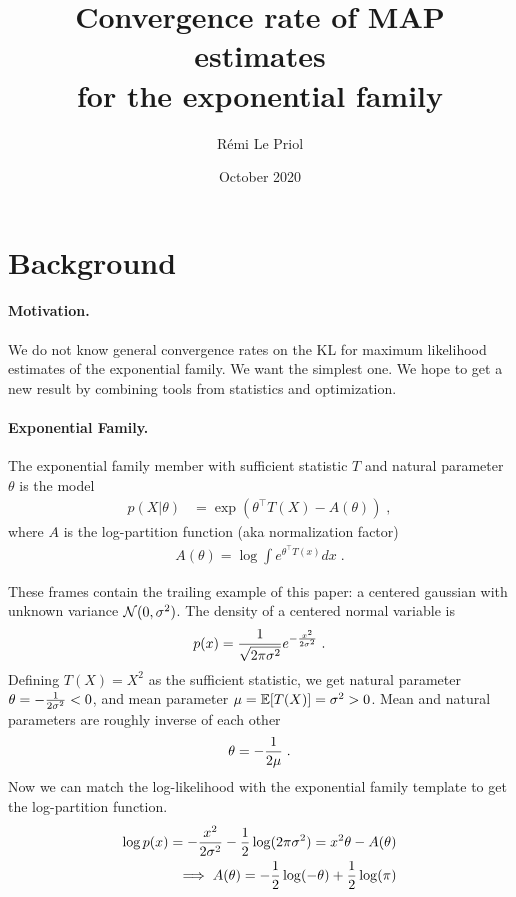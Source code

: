\documentclass{article}
\title{Convergence rate of MAP estimates \\
for the exponential family}
\author{R\'emi Le Priol}
\date{October 2020}
\newenvironment{example}{
	\begin{mdframed}[backgroundcolor=light-gray, roundcorner=5pt]
}{		
	\end{mdframed}
}
\newcommand{\logpart}{A}
\newcommand{\natp}{\theta}
\begin{document}
\maketitle

\section{Background}

\paragraph{Motivation.} 
We do not know general convergence rates on the KL for maximum likelihood estimates of the exponential family.
We want the simplest one.
We hope  to get a new result by combining tools from statistics and optimization. 
\paragraph{Exponential Family.}
The exponential family member with sufficient statistic $T$ and natural parameter $\natp$ is the model 
\begin{align}
    p(X|\natp) &= \exp( \natp^\top T(X) - \logpart(\natp)) \; ,
\end{align}
where $\logpart$ is the log-partition function (aka normalization factor) 
\begin{align}
    \logpart(\natp) = \log \int e^{\natp^\top T(x)} dx \; .
\end{align}

\begin{example}
	These frames contain the trailing example of this paper: a centered gaussian with unknown variance ${\mathcal N}(0,\sigma^2)$.
	The density of a centered normal variable is
\begin{align}
	p(x) = \frac{1}{\sqrt{2\pi \sigma^2}} e^{-\frac{x^2}{2 \sigma^2}} \; .
\end{align}
Defining $T(X)=X^2$ as the sufficient statistic, we get natural parameter $\natp = -\inv{2 \sigma^2} <0$, and mean parameter $\mu=\operatorname{\mathbb{E}}[T(X)] = \sigma^2 >0$. 
Mean and natural parameters are roughly inverse of each other
\begin{align}
	\natp = -\inv{2 \mu}\; .
\end{align}
Now we can match the log-likelihood with the exponential family template to get the log-partition function.
\begin{align}
	\log p(x) = - \frac{x^2}{2 \sigma^2} - \half \log(2 \pi \sigma^2 ) 
	= x^2 \natp - \logpart(\natp) \\
	\implies \logpart (\natp) = - \half \log(-\natp)  + \half \log(\pi) 
\end{align}
\end{example}
\end{document}
